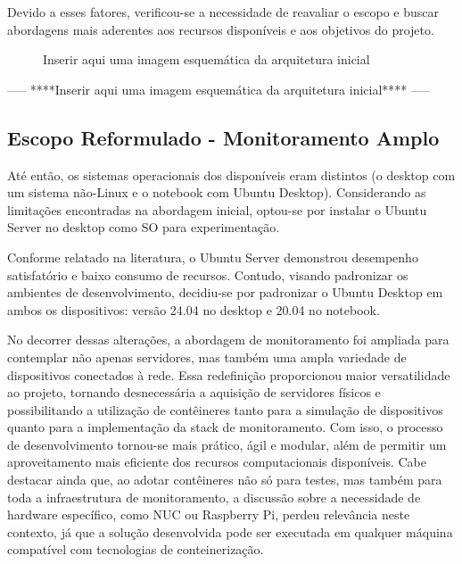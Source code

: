 {Devido a esses fatores, verificou-se a necessidade de reavaliar o escopo e buscar abordagens mais aderentes aos recursos disponíveis e aos objetivos do projeto.

\begin{figure}[H]
\centering
\fbox{\rule{0pt}{150pt} \rule{200pt}{0pt}} %
\caption{Inserir aqui uma imagem esquemática da arquitetura inicial}
\label{fig:placeholder}
\end{figure}

-----
****Inserir aqui uma imagem esquemática da arquitetura inicial****
-----

\subsection{Escopo Reformulado - Monitoramento Amplo}
\label{subsection:EscopoReformulado}

Até então, os sistemas operacionais dos  disponíveis eram distintos (o desktop com um sistema não-Linux e o notebook com Ubuntu Desktop). Considerando as limitações encontradas na abordagem inicial, optou-se por instalar o Ubuntu Server no desktop como SO para experimentação.

Conforme relatado na literatura, o Ubuntu Server demonstrou desempenho satisfatório e baixo consumo de recursos. Contudo, visando padronizar os ambientes de desenvolvimento, decidiu-se por padronizar o Ubuntu Desktop em ambos os dispositivos: versão 24.04 no desktop e 20.04 no notebook.

No decorrer dessas alterações, a abordagem de monitoramento foi ampliada para contemplar não apenas servidores, mas também uma ampla variedade de dispositivos conectados à rede. Essa redefinição proporcionou maior versatilidade ao projeto, tornando desnecessária a aquisição de servidores físicos e possibilitando a utilização de contêineres tanto para a simulação de dispositivos quanto para a implementação da stack de monitoramento. Com isso, o processo de desenvolvimento tornou-se mais prático, ágil e modular, além de permitir um aproveitamento mais eficiente dos recursos computacionais disponíveis. Cabe destacar ainda que, ao adotar contêineres não só para testes, mas também para toda a infraestrutura de monitoramento, a discussão sobre a necessidade de hardware específico, como NUC ou Raspberry Pi, perdeu relevância neste contexto, já que a solução desenvolvida pode ser executada em qualquer máquina compatível com tecnologias de conteinerização.

}
